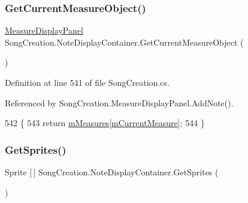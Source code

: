\mbox{\label{class_song_creation_1_1_note_display_container_a72a72e35af39cad274edbf2acb6fbd2e}} 
\subsubsection{\texorpdfstring{Get\+Current\+Measure\+Object()}{GetCurrentMeasureObject()}}
{\footnotesize\ttfamily \hyperlink{class_song_creation_1_1_measure_display_panel}{Measure\+Display\+Panel} Song\+Creation.\+Note\+Display\+Container.\+Get\+Current\+Measure\+Object (\begin{DoxyParamCaption}{ }\end{DoxyParamCaption})}



Definition at line 541 of file Song\+Creation.\+cs.



Referenced by Song\+Creation.\+Measure\+Display\+Panel.\+Add\+Note().


\begin{DoxyCode}
542         \{
543             \textcolor{keywordflow}{return} \hyperlink{class_song_creation_1_1_note_display_container_a19c1c32db579c642fbc1b5bce0c80e7a}{mMeasures}[\hyperlink{class_song_creation_1_1_note_display_container_ad63614e1c51c2db44cfc0fc21704c4ff}{mCurrentMeasure}];
544         \}
\end{DoxyCode}
\mbox{\label{class_song_creation_1_1_note_display_container_a7165497797fbeea51e1571c69c5f510c}} 
\subsubsection{\texorpdfstring{Get\+Sprites()}{GetSprites()}}
{\footnotesize\ttfamily Sprite \mbox{[}$\,$\mbox{]} Song\+Creation.\+Note\+Display\+Container.\+Get\+Sprites (\begin{DoxyParamCaption}{ }\end{DoxyParamCaption})}



